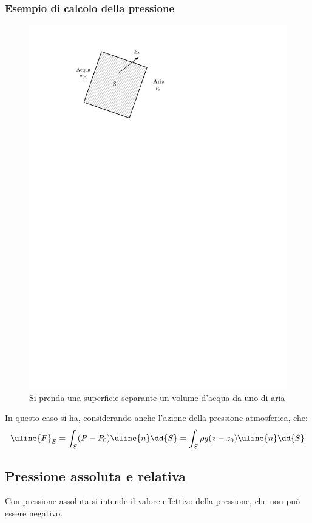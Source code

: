 \subsubsection{Esempio di calcolo della pressione}
	\begin{figure}[h]
		\includegraphics[scale=1.0]{./2.1 Fluido fermo e pressione/2.1-1}
		\centering
		\caption{Si prenda una superficie separante un volume d'acqua da uno di aria}
	\end{figure}
In questo caso si ha, considerando anche l'azione della pressione atmosferica, che:
	\begin{equation*}
		\uline{F}_S = \int_S (P - P_0) \uline{n} \dd{S} = \int_S \rho g (z - z_0) \uline{n} \dd{S}
	\end{equation*}

\subsection{Pressione assoluta e relativa}
Con pressione assoluta si intende il valore effettivo della pressione, che non può essere negativo.

